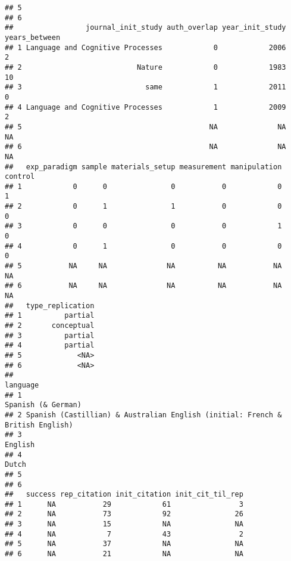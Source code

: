 \documentclass[
  english,
  man]{apa6}
\begin{document}
\begin{verbatim}
## 5                                                                                                                                                                                                                            
## 6                                                                                                                                                                                                                            
##                 journal_init_study auth_overlap year_init_study years_between
## 1 Language and Cognitive Processes            0            2006             2
## 2                           Nature            0            1983            10
## 3                             same            1            2011             0
## 4 Language and Cognitive Processes            1            2009             2
## 5                                            NA              NA            NA
## 6                                            NA              NA            NA
##   exp_paradigm sample materials_setup measurement manipulation control
## 1            0      0               0           0            0       1
## 2            0      1               1           0            0       0
## 3            0      0               0           0            1       0
## 4            0      1               0           0            0       0
## 5           NA     NA              NA          NA           NA      NA
## 6           NA     NA              NA          NA           NA      NA
##   type_replication
## 1          partial
## 2       conceptual
## 3          partial
## 4          partial
## 5             <NA>
## 6             <NA>
##                                                                        language
## 1                                                            Spanish (& German)
## 2 Spanish (Castillian) & Australian English (initial: French & British English)
## 3                                                                       English
## 4                                                                         Dutch
## 5                                                                              
## 6                                                                              
##   success rep_citation init_citation init_cit_til_rep
## 1      NA           29            61                3
## 2      NA           73            92               26
## 3      NA           15            NA               NA
## 4      NA            7            43                2
## 5      NA           37            NA               NA
## 6      NA           21            NA               NA
\end{verbatim}
\end{document}
